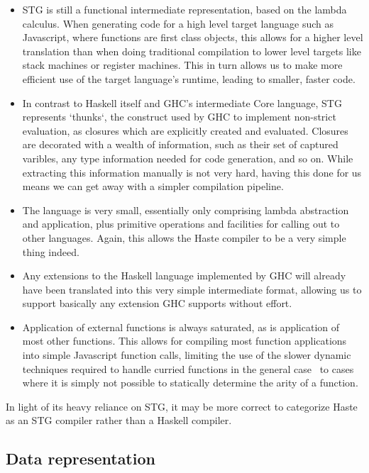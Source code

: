 \documentclass[preprint]{sigplanconf}
\begin{document}
\begin{itemize}
  \item STG is still a functional intermediate representation, based on the
        lambda calculus. When generating code for a high level target language
        such as Javascript, where functions are first class objects, this
        allows for a higher level translation than when doing traditional
        compilation to lower level targets like stack machines or register
        machines. This in turn allows us to make more efficient use of the
        target language's runtime, leading to smaller, faster code.
  \item In contrast to Haskell itself and GHC's intermediate Core language, STG
        represents `thunks`, the construct used by GHC to implement non-strict
        evaluation, as closures which are explicitly created and evaluated.
        Closures are decorated with a wealth of information, such as their set
        of captured varibles, any type information needed for code generation,
        and so on. While extracting this information manually is not very hard,
        having this done for us means we can get away with a simpler
        compilation pipeline.
  \item The language is very small, essentially only comprising lambda
        abstraction and application, plus primitive operations and facilities
        for calling out to other languages. Again, this allows the Haste
        compiler to be a very simple thing indeed.
  \item Any extensions to the Haskell language implemented by GHC will already
        have been translated into this very simple intermediate format,
        allowing us to support basically any extension GHC supports without
        effort.
  \item Application of external functions is always saturated, as is
        application of most other functions. This allows for compiling most
        function applications into simple Javascript function calls, limiting
        the use of the slower dynamic techniques required to handle curried
        functions in the general case\ \cite{fastcurry} to cases where it is
        simply not possible to statically determine the arity of a function.
\end{itemize}

In light of its heavy reliance on STG, it may be more correct to categorize
Haste as an STG compiler rather than a Haskell compiler.

\subsection{Data representation}
\end{document}
